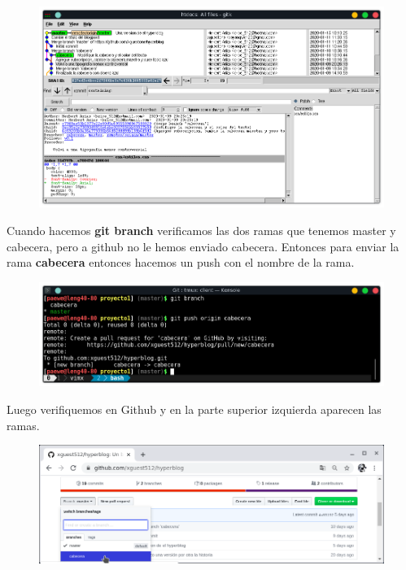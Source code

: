 \documentclass{article}
\begin{document}
\newpage

\begin{figure}[h!]
  \centering
  \includegraphics[scale=0.75]{./Pictures/249_gitk.png}
\end{figure}

Cuando hacemos \textbf{git branch} verificamos las dos ramas que tenemos master
y cabecera, pero a github no le hemos enviado cabecera. Entonces para enviar la
rama \textbf{cabecera} entonces hacemos un push con el nombre de la rama.

\begin{figure}[h!]
  \centering
  \includegraphics[scale=0.75]{./Pictures/250_push_cabecera.png}
\end{figure}

Luego verifiquemos en Github y en la parte superior izquierda aparecen las
ramas.

\begin{figure}[h!]
  \centering
  \includegraphics[scale=0.75]{./Pictures/251_cabecera_github.png}
\end{figure}
\end{document}
